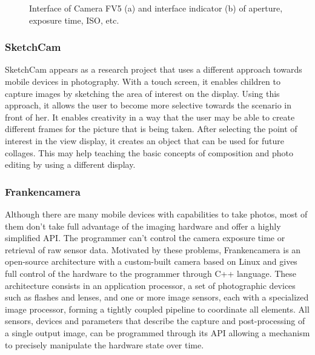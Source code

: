 \begin{figure}[htbp]
        \centering
  \caption{Interface of Camera FV5 (a) and interface indicator (b) of aperture, exposure time, ISO, etc. \cite{FV5}}
  \label{fig:FV5_image}
\end{figure}


\subsubsection{SketchCam}

SketchCam appears as a research project that uses a different approach towards mobile devices in photography. With a touch screen, it enables children to capture images by sketching the area of interest on the display. 
Using this approach, it allows the user to become more selective towards the scenario in front of her. It enables creativity in a way that the user may be able to create different frames for the picture that is being taken.  After selecting the point of interest in the view display, it creates an object that can be used for future collages. This may help teaching the basic concepts of composition and photo editing by using a different display. 


\subsubsection{Frankencamera}

Although there are many mobile devices with capabilities to take photos, most of them don't take full advantage of the imaging hardware and offer a highly simplified API. The programmer can't control the camera exposure time or retrieval of raw sensor data. Motivated by these problems, Frankencamera is an open-source architecture with a custom-built camera based on Linux and gives full control of the hardware to the programmer through C++ language. These architecture consists in an application processor, a set of photographic devices such as flashes and lenses, and one or more image sensors, each with a specialized image processor, forming a tightly coupled pipeline to coordinate all elements. All sensors, devices and parameters that describe the capture and post-processing of a single output image, can be programmed through its API allowing a mechanism to precisely manipulate the hardware state over time.

